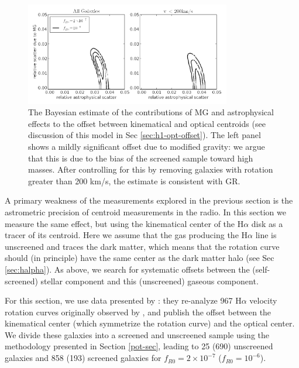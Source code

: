 \documentclass{emulateapj}
\newcommand{\ha}{H$\alpha$}
\begin{document}
\begin{figure}
\begin{center}
  \includegraphics[width=0.8\textwidth]{figures/sec4_2_offset.png}
  \caption{The Bayesian estimate of the contributions of MG and astrophysical
effects to the offset between kinematical and optical centroids
(see discussion of this model in Sec \ref{sec:h1-opt-offset}).  The left
    panel shows a mildly significant offset due to modified gravity:
    we argue that this is due to the bias of the screened sample toward
    high masses.  After controlling for this by removing galaxies
    with rotation greater than 200 km/s, the estimate is
    consistent with GR. 
    }
  \label{offset-kin-den-2}
\end{center}
\end{figure}

A primary weakness of the measurements explored in the previous section is
the astrometric precision of centroid measurements in the radio.  In
this section we measure the same effect, but using the kinematical
center of the \ha{} disk as a tracer of its centroid.  Here we assume that
the gas producing the \ha{} line is unscreened and traces the dark matter,
which means that the rotation curve should (in principle) have the same
center as the dark matter halo (see Sec \ref{sec:halpha}).
As above, we search for systematic offsets
between the (self-screened) stellar component and this (unscreened) gaseous
component.

For this section, we use data presented by \citet{persic1995}:
they re-analyze 967 \ha{} velocity rotation curves originally 
observed by \citet{mat92}, and publish the offset between the kinematical
center (which symmetrize the rotation curve) and the optical center.  We divide these galaxies into a screened
and unscreened sample using the methodology presented in Section \ref{pot-sec},
leading to 25 (690) unscreened galaxies and 858 (193) screened galaxies
for $f_{R0} = 2 \times 10^{-7}$ ($f_{R0} = 10^{-6}$).
\end{document}
